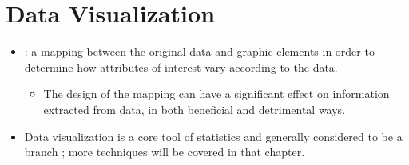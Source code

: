 \section{Data Visualization}
\begin{itemize}
  \item {}: a mapping between the original data and graphic elements in order to determine how attributes of interest vary according to the data.
    \begin{itemize}
      \item The design of the mapping can have a significant effect on information extracted from data, in both beneficial and detrimental ways.
    \end{itemize}
  \item Data visualization is a core tool of statistics and generally considered to be a branch \hyperref[Chapter: Descriptive Statistics]{}; more techniques will be covered in that chapter.

\end{itemize}

